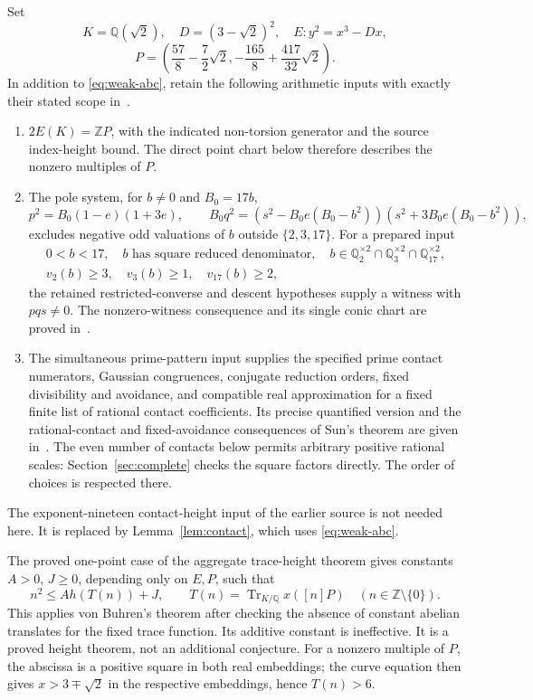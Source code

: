 \documentclass[11pt,a4paper]{article}
\newcommand{\Q}{\mathbb Q}\newcommand{\Z}{\mathbb Z}
\DeclareMathOperator{\Tr}{Tr}\DeclareMathOperator{\rad}{rad}
\begin{document}
Set
\[
 K=\Q(\sqrt2),\quad D=(3-\sqrt2)^2,\quad
 E:y^2=x^3-Dx,
\]
\[
 P=\left(\frac{57}{8}-\frac72\sqrt2,
                 -\frac{165}{8}+\frac{417}{32}\sqrt2\right).
\]
In addition to \eqref{eq:weak-abc}, retain the following arithmetic inputs with
exactly their stated scope in~\cite{Dependencies,Source27}.
\begin{enumerate}
\item $2E(K)=\Z P$, with the indicated non-torsion generator
and the source index-height bound. The direct point chart below
therefore describes the nonzero multiples of $P$.
\item The pole system, for $b\ne0$ and $B_0=17b$,
\[
 p^2=B_0(1-e)(1+3e),\qquad
 B_0q^2=(s^2-B_0e(B_0-b^2))(s^2+3B_0e(B_0-b^2)),
\]
excludes negative odd valuations of $b$ outside $\{2,3,17\}$.
For a prepared input
\begin{equation}\label{eq:prepared}
 \begin{gathered}
 0<b<17,\quad b\text{ has square reduced denominator},\quad
 b\in\Q_2^{\times2}\cap\Q_3^{\times2}\cap\Q_{17}^{\times2},\\
 v_2(b)\ge3,\quad v_3(b)\ge1,\quad v_{17}(b)\ge2,
 \end{gathered}
\end{equation}
the retained restricted-converse and descent hypotheses supply a
witness with $pqs\ne0$. The nonzero-witness consequence and its
single conic chart are proved in~\cite[Lemma~2]{Source27}.
\item The simultaneous prime-pattern input supplies the specified
prime contact numerators, Gaussian congruences, conjugate reduction
orders, fixed divisibility and avoidance, and compatible real
approximation for a fixed finite list of rational contact coefficients.
Its precise quantified version and the rational-contact and fixed-avoidance
consequences of Sun's theorem are given in~\cite{Dependencies}.
The even number of contacts below permits arbitrary positive rational
scales: Section~\ref{sec:complete} checks the square factors directly.
The order of choices is respected there.
\end{enumerate}
The exponent-nineteen contact-height input of the earlier source is
not needed here. It is replaced by Lemma~\ref{lem:contact}, which
uses \eqref{eq:weak-abc}.

The proved one-point case of the aggregate trace-height theorem
\cite{Trace} gives constants $A>0$, $J\ge0$, depending only on
$E,P$, such that
\begin{equation}\label{eq:traceheight}
 n^2\le A h(T(n))+J,\qquad
 T(n)=\Tr_{K/\Q}x([n]P)\quad(n\in\Z\setminus\{0\}).
\end{equation}
This applies von Buhren's theorem after checking the absence of
constant abelian translates for the fixed trace function. Its additive
constant is ineffective. It is a proved height theorem, not an
additional conjecture. For a nonzero multiple of $P$, the abscissa
is a positive square in both real embeddings; the curve equation
then gives $x>3\mp\sqrt2$ in the respective embeddings, hence
$T(n)>6$.
\end{document}
